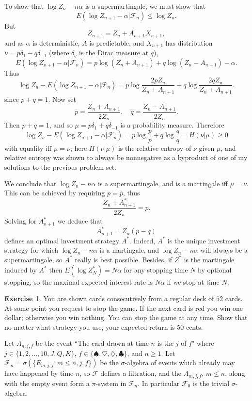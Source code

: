 \documentclass[10pt]{article}
\theoremstyle{definition}
\newtheorem{exer}{Exercise}
\begin{document}
To show that $\log Z_n - n\alpha$ is a supermartingale, we must show that
$$E(\log Z_{n+1} - \alpha|\mathcal F_n) \leq \log Z_n.$$
But
$$Z_{n+1} = Z_n + A_{n+1}X_{n+1},$$
and as $\alpha$ is deterministic, $A$ is predictable, and $X_{n+1}$ has distribution $\nu = p\delta_1 - q\delta_{-1}$ (where $\delta_q$ is the Dirac measure at $q$),
$$E(\log Z_{n+1} - \alpha|\mathcal F_n) = p\log(Z_n + A_{n+1}) + q\log(Z_n - A_{n+1}) - \alpha.$$
Thus
$$\log Z_n - E(\log Z_{n+1} - \alpha|\mathcal F_n) = p \log \frac{2pZ_n}{Z_n + A_{n+1}} + q\log \frac{2qZ_n}{Z_n + A_{n+1}}.$$
since $p + q = 1$.
Now set
$$\overline p = \frac{Z_n + A_{n+1}}{2Z_n}, \quad \overline q = \frac{Z_n - A_{n+1}}{2Z_n}.$$
Then $\overline p + \overline q = 1$, and so $\mu = \overline p \delta_1 + \overline q \delta_{-1}$ is a probability measure.
Therefore
$$\log Z_n - E(\log Z_{n+1} - \alpha|\mathcal F_n) = p \log \frac{p}{\overline p} + q \log \frac{q}{\overline q} = H(\nu|\mu) \geq 0$$
with equality iff $\mu = \nu$; here $H(\nu|\mu)$ is the relative entropy of $\nu$ given $\mu$, and relative entropy was shown to always be nonnegative as a byproduct of one of my solutions to the previous problem set.

We conclude that $\log Z_n - n\alpha$ is a supermartingale, and is a martingale iff $\mu = \nu$.
This can be achieved by requiring $p = \overline p$, thus
$$\frac{Z_n + A_{n+1}^*}{2Z_n} = p.$$
Solving for $A_{n+1}^*$ we deduce that
$$A_{n+1}^* = Z_n(p - q)$$
defines an optimal investment strategy $A^*$.
Indeed, $A^*$ is the unique investment strategy for which $\log Z_n - n\alpha$ is a martingale, and $\log Z_n - n\alpha$ will always be a supermartingale, so $A^*$ really is best possible.
Besides, if $Z^*$ is the martingale induced by $A^*$ then $E(\log Z_N^*) = N\alpha$ for any stopping time $N$ by optional stopping, so the maximal expected interest rate is $N\alpha$ if we stop at time $N$.

\begin{exer}
You are shown cards consecutively from a regular deck of $52$ cards. At some point you request to stop the game.
If the next card is red you win one dollar; otherwise you win nothing. You can stop the game at any time.
Show that no matter what strategy you use, your expected return is $50$ cents.
\end{exer}

Let $A_{n,j,f}$ be the event ``The card drawn at time $n$ is the $j$ of $f$" where $j \in \{1, 2, \dots, 10, J,Q,K\}$, $f \in \{\spadesuit, \heartsuit, \diamondsuit, \clubsuit\}$, and $n \geq 1$.
Let $\mathcal F_n = \sigma(\{E_{m,j,f}:m \leq n,j,f\})$ be the $\sigma$-algebra of events which already may have happened by time $n$, so $\mathcal F$ defines a filtration, and the $A_{m,j,f}$, $m \leq n$, along with the empty event form a $\pi$-system in $\mathcal F_n$.
In particular $\mathcal F_0$ is the trivial $\sigma$-algebra.
\end{document}
